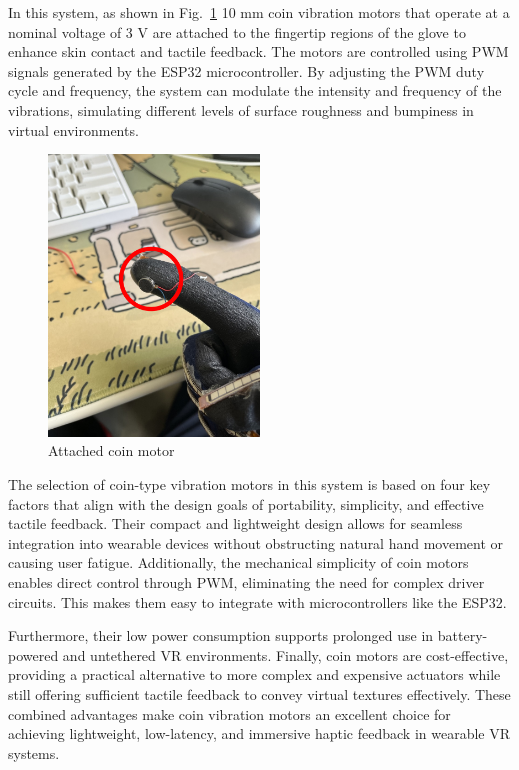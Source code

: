 In this system, as shown in Fig.~\ref{fig:coin_motor_2} 10 mm coin vibration motors that operate at a nominal voltage of 3 V are attached to the fingertip regions of the glove to enhance skin contact and tactile feedback. The motors are controlled using PWM signals generated by the ESP32 microcontroller. By adjusting the PWM duty cycle and frequency, the system can modulate the intensity and frequency of the vibrations, simulating different levels of surface roughness and bumpiness in virtual environments.

\begin{figure}[H]\centering
	\includegraphics[width=0.5\textwidth]{Pictures/coin_motor_2.png}%
	\caption{Attached coin motor}\label{fig:coin_motor_2}%
\end{figure}

The selection of coin-type vibration motors in this system is based on four key factors that align with the design goals of portability, simplicity, and effective tactile feedback. Their compact and lightweight design allows for seamless integration into wearable devices without obstructing natural hand movement or causing user fatigue. Additionally, the mechanical simplicity of coin motors enables direct control through PWM, eliminating the need for complex driver circuits. This makes them easy to integrate with microcontrollers like the ESP32. 

Furthermore, their low power consumption supports prolonged use in battery-powered and untethered VR environments. Finally, coin motors are cost-effective, providing a practical alternative to more complex and expensive actuators while still offering sufficient tactile feedback to convey virtual textures effectively. These combined advantages make coin vibration motors an excellent choice for achieving lightweight, low-latency, and immersive haptic feedback in wearable VR systems.
\newpage
